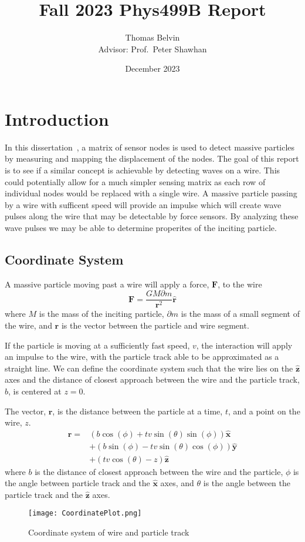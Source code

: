 \documentclass{report}
\title{Fall 2023 Phys499B Report}
\author{Thomas Belvin\\[1cm]{\small Advisor: Prof.~Peter Shawhan}}
\date{December 2023}
\begin{document}
\maketitle
\chapter*{Introduction}
In this dissertation~\cite{Gosh2023}, a matrix of sensor nodes is used to detect massive particles by measuring and mapping the displacement of the nodes.
The goal of this report is to see if a similar concept is achievable by detecting waves on a wire.
This could potentially allow for a much simpler sensing matrix as each row of individual nodes would be replaced with a single wire.
A massive particle passing by a wire with sufficent speed will provide an impulse which will create wave pulses along the wire that may be detectable by force sensors. 
By analyzing these wave pulses we may be able to determine properites of the inciting particle.

\section*{Coordinate System}
A massive particle moving past a wire will apply a force, $\mathbf{F}$, to the wire 
\begin{equation}
    \mathbf{F} = \frac{G M \partial m}{\mathbf{r}^2} \mathbf{\hat r}
    \label{eqn:force}
\end{equation}
where $M$ is the mass of the inciting particle, $\partial m$ is the mass of a small segment of the wire, and $\mathbf{r}$ is the vector between the particle and wire segment.

If the particle is moving at a sufficiently fast speed, $v$, the  interaction will apply an impulse to the wire, with the particle track able to be approximated as a straight line. 
We can define the coordinate system such that the wire lies on the $\mathbf{\hat z}$ axes and the distance of closest approach between the wire and the particle track, $b$, is centered at $z = 0$.

The vector, $\mathbf{r}$, is the distance between the particle at a time, $t$, and a point on the wire, $z$.
\begin{align}
    \nonumber \mathbf{r}=& (b \cos (\phi )+t v \sin (\theta ) \sin (\phi )) \mathbf{\hat x} \\
               \nonumber & +(b \sin (\phi )-t v \sin (\theta ) \cos (\phi )) \mathbf{\hat y}\\
                         & + (t v \cos (\theta )-z) \mathbf{\hat z}
    \label{eqn:r}
\end{align}
where $b$ is the distance of closest approach between the wire and the particle, $\phi$ is the angle between particle track and the $\mathbf{\hat x}$ axes, and $\theta$ is the angle between the particle track and the $\mathbf{\hat z}$ axes.
\begin{figure}[H]
    \texttt{[image: CoordinatePlot.png]}
    \caption{Coordinate system of wire and particle track}\label{fig:coordSys}
\end{figure}
\end{document}

